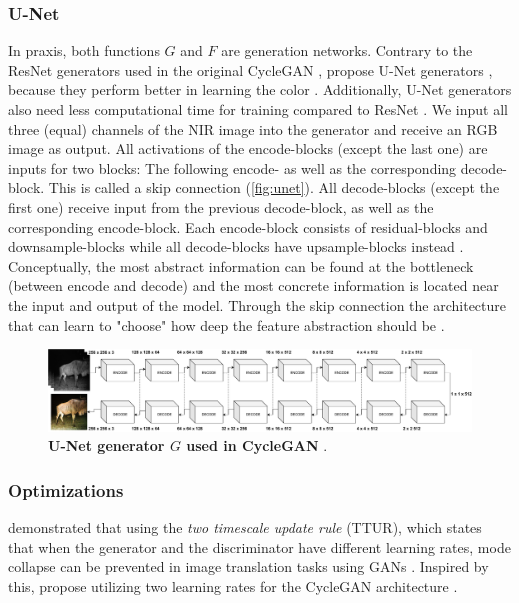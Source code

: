 \subsubsection*{U-Net}
\label{sec:cycle-gan-u-net}
In praxis, both functions $G$ and $F$ are generation networks. Contrary to the ResNet generators \parencite{resnet} \citeauthor{cyclegan-original} used in the original CycleGAN \parencite{cyclegan-original},
\citeauthor*{mehri} propose U-Net generators \parencite{unet}, because they perform better in learning the color \parencite{mehri}.
Additionally, U-Net generators also need less computational time for training compared to ResNet \parencite{mehri}.
We input all three (equal) channels of the NIR image into the generator and receive an RGB image as output.
All activations of the encode-blocks (except the last one) are inputs for two blocks:
The following encode- as well as the corresponding decode-block. This is called a skip connection \parencite{unet} (\autoref{fig:unet}). 
All decode-blocks (except the first one) receive input from the previous decode-block, as well as the corresponding encode-block.
Each encode-block consists of residual-blocks and downsample-blocks while all decode-blocks have upsample-blocks instead \parencite{unet}. 
Conceptually, the most abstract information can be found at the bottleneck (between encode and decode) and the most concrete information is located near the input and output of the model.
Through the skip connection the architecture that can learn to "choose" how deep the feature abstraction should be \parencite{unet}.

\begin{figure}[h]
   \includegraphics[width=\textwidth]{gfx/CycleGAN-Unet.pdf}
   \caption{
      \textbf{U-Net generator $G$ used in CycleGAN} \parencite{unet,mehri}.
   }
   \label{fig:unet}
\end{figure}

\subsubsection*{Optimizations}
 demonstrated that using the \textit{two timescale update rule} (TTUR), which states that when the generator and the discriminator have different learning rates,
mode collapse can be prevented in image translation tasks using GANs \parencite{ttur}.
Inspired by this, \citeauthor*{mehri} propose utilizing two learning rates for the CycleGAN architecture \parencite{mehri}.

